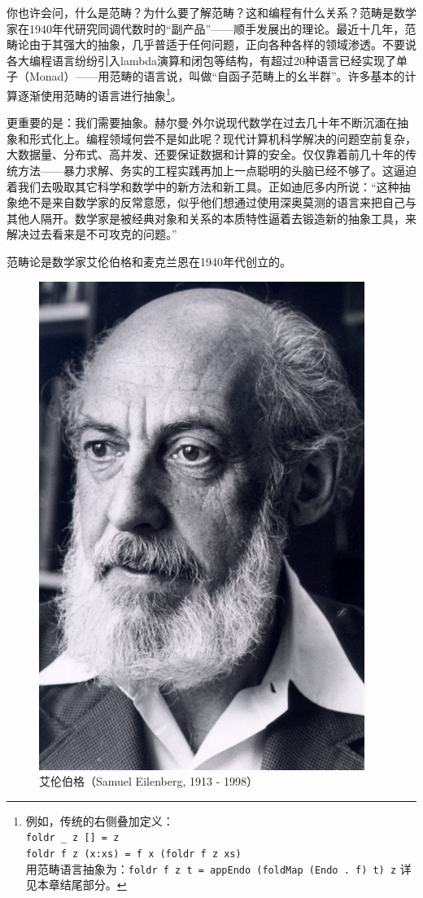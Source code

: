 \documentclass[b5paper]{ctexart}
\begin{document}
你也许会问，什么是范畴？为什么要了解范畴？这和编程有什么关系？范畴是数学家在1940年代研究同调代数时的“副产品”——顺手发展出的理论。最近十几年，范畴论由于其强大的抽象，几乎普适于任何问题，正向各种各样的领域渗透。不要说各大编程语言纷纷引入lambda演算和闭包等结构，有超过20种语言已经实现了单子（Monad）\cite{Monad-Haskell-Wiki}——用范畴的语言说，叫做“自函子范畴上的幺半群”。许多基本的计算逐渐使用范畴的语言进行抽象\footnote{例如，传统的右侧叠加定义：\\
\lstinline{foldr _ z [] = z} \\
\lstinline{foldr f z (x:xs) = f x (foldr f z xs)} \\
用范畴语言抽象为：\lstinline{foldr f z t = appEndo (foldMap (Endo . f) t) z} 详见本章结尾部分。}。

更重要的是：我们需要抽象。赫尔曼$\cdot$外尔说现代数学在过去几十年不断沉湎在抽象和形式化上。编程领域何尝不是如此呢？现代计算机科学解决的问题空前复杂，大数据量、分布式、高并发、还要保证数据和计算的安全。仅仅靠着前几十年的传统方法——暴力求解、务实的工程实践再加上一点聪明的头脑已经不够了。这逼迫着我们去吸取其它科学和数学中的新方法和新工具。正如迪厄多内所说：“这种抽象绝不是来自数学家的反常意愿，似乎他们想通过使用深奥莫测的语言来把自己与其他人隔开。数学家是被经典对象和关系的本质特性逼着去锻造新的抽象工具，来解决过去看来是不可攻克的问题。”\cite{Dieudonne1987}%

范畴论是数学家艾伦伯格和麦克兰恩在1940年代创立的。

\begin{figure}[htbp]
 \centering
 \includegraphics[scale=0.25]{img/Eilenberg.png}
 \captionsetup{labelformat=empty}
 \caption{艾伦伯格（Samuel Eilenberg, 1913 - 1998）}
 \label{fig:Eilenberg}
\end{figure}
\end{document}

